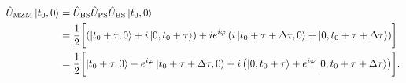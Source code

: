 \begin{equation}
	\begin{split}
		\hat{U}_\text{MZM}
		\ket{t_0,0}
		&=
		\hat{U}_\text{BS}
		\hat{U}_\text{PS}
		\hat{U}_\text{BS}
		\ket{t_0,0}
		\\
		&=
		\frac{1}{2}
		\biggl[
			\left(
				\ket{t_0+\tau,0}
				+
				i\ket{0,t_0+\tau}
			\right)
			+
			ie^{i\varphi}
			\left(
				i\ket{t_0+\tau+\Delta\tau,0}
				+
				\ket{0,t_0+\tau+\Delta\tau}
			\right)
		\biggr]
		\\
		&=
		\frac{1}{2}
		\biggl[
			\ket{t_0+\tau,0}
			-
			e^{i\varphi}
			\ket{t_0+\tau+\Delta\tau,0}
			+
			i
			\left(
				\ket{0,t_0+\tau}
				+
				e^{i\varphi}
				\ket{0,t_0+\tau+\Delta\tau}
			\right)
		\biggr]
		.
	\end{split}
	\label{eq:mzi_asym}
\end{equation}

